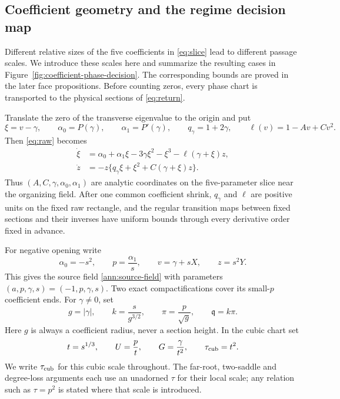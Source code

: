 \subsection{Coefficient geometry and the regime decision map}
\label{sec:coefficient-regimes}

Different relative sizes of the five coefficients in \eqref{eq:slice}
lead to different passage scales. We introduce these scales here and
summarize the resulting cases in Figure~\ref{fig:coefficient-phase-decision}.
The corresponding bounds are proved in the later face propositions.
Before counting zeros, every phase chart is transported to the physical
sections of \eqref{eq:return}.

Translate the zero of the transverse eigenvalue to the origin and put
\begin{equation}
 \xi=v-\gamma,
 \qquad \alpha _0=P(\gamma),
 \qquad \alpha _1=P'(\gamma),
 \qquad q_\gamma=1+2\gamma,
 \qquad \ell(v)=1-Av+Cv^2.
 \label{deg:central-coordinates}
\end{equation}
Then \eqref{eq:raw} becomes
\begin{equation}
 \begin{split}
  \dot \xi&=\alpha _0+\alpha _1\xi-3\gamma \xi^2-\xi^3
                 -\ell(\gamma+\xi)z,\\
  \dot z&=-z\{q_\gamma \xi+\xi^2+C(\gamma+\xi)z\}.
 \end{split}
 \label{deg:central-field}
\end{equation}
Thus \((A,C,\gamma,\alpha _0,\alpha _1)\) are analytic coordinates on
the five-parameter slice near the organizing field. After one common
coefficient shrink, \(q_\gamma\) and \(\ell\) are positive units on the
fixed raw rectangle, and the regular transition maps between fixed sections
and their inverses have uniform bounds through every derivative order fixed
in advance.

For negative opening write
\begin{equation}
 \alpha _0=-s^2,
 \qquad p=\frac{\alpha _1}{s},
 \qquad v=\gamma+sX,
 \qquad z=s^2Y.
 \label{deg:source-dictionary}
\end{equation}
This gives the source field \eqref{ann:source-field} with parameters
\((a,p,\gamma,s)=(-1,p,\gamma,s)\). Two exact compactifications cover
its small-\(p\) coefficient ends. For \(\gamma\ne0\), set
\begin{equation}
 g=|\gamma|,\qquad k=\frac{s}{g^{3/2}},\qquad
 \pi=\frac{p}{\sqrt g},\qquad \mathfrak q=k\pi .
 \label{deg:gamma-chart}
\end{equation}
Here \(g\) is always a coefficient radius, never a section height. In the
cubic chart set
\begin{equation}
 t=s^{1/3},\qquad U=\frac{p}{t},\qquad
 G=\frac{\gamma}{t^2},\qquad \tau_{\rm cub}=t^2.
 \label{deg:cubic-chart}
\end{equation}
We write \(\tau_{\rm cub}\) for this cubic scale throughout. The
far-root, two-saddle and degree-loss arguments each use an unadorned
\(\tau\) for their local scale; any relation such as \(\tau=p^2\)
is stated where that scale is introduced.

